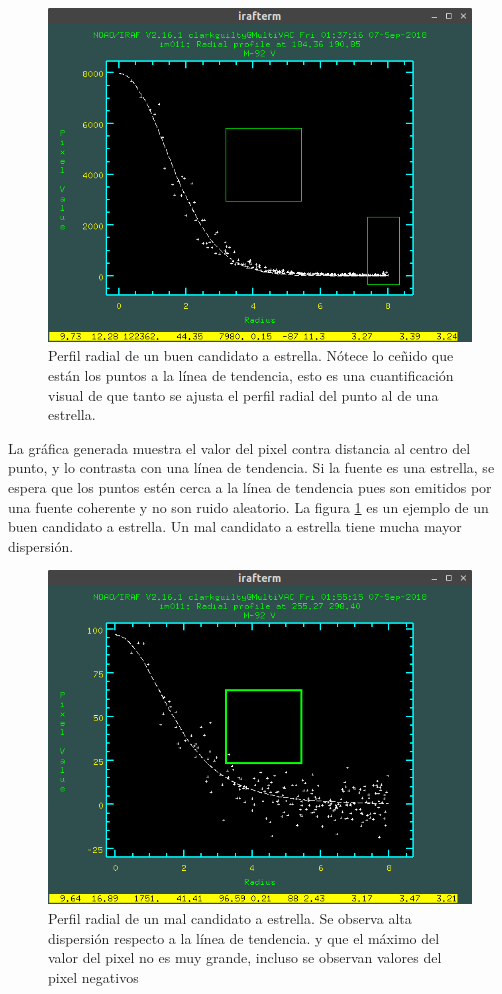 \documentclass[12pt]{article}
\begin{document}
\begin{figure}[H]
  \centering
   \includegraphics[scale= 0.6]{im05.png}
  \caption{Perfil radial de un buen candidato a estrella. Nótece lo ceñido que están los puntos a la línea de tendencia, esto es una cuantificación visual de que tanto se ajusta el perfil radial del punto al de una estrella.}
  \label{im05}
\end{figure}

La gráfica generada muestra el valor del pixel contra distancia al centro del punto, y lo contrasta con una línea de tendencia. Si la fuente es una estrella, se espera que los puntos estén cerca a la línea de tendencia pues son emitidos por una fuente coherente y no son ruido aleatorio. La figura \ref{im05} es un ejemplo de un buen candidato a estrella. Un mal candidato a estrella tiene mucha mayor dispersión. 



\begin{figure}[H]
  \centering
   \includegraphics[scale= 0.6]{im06.png}
  \caption{Perfil radial de un mal candidato a estrella. Se observa alta dispersión respecto a la línea de tendencia. y que el máximo del valor del pixel no es muy grande, incluso se observan valores del pixel negativos}
  \label{im06}
\end{figure}
\end{document}
